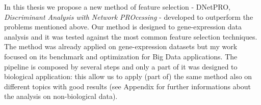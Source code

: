 \documentclass{standalone}
\begin{document}
In this thesis we propose a new method of feature selection - DNetPRO, \emph{Discriminant Analysis with Network PROcessing} - developed to outperform the problems mentioned above.
Our method is designed to gene-expression data analysis and it was tested against the most common feature selection techniques.
The method was already applied on gene-expression datasets but my work focused on its benchmark and optimization for Big Data applications.
The pipeline is composed by several steps and only a part of it was designed to biological application: this allow us to apply (part of) the same method also on different topics with good results (see Appendix for further informations about the analysis on non-biological data).
\end{document}
